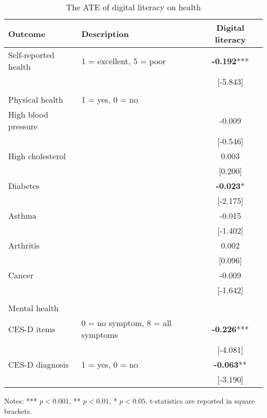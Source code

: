 \documentclass[11pt]{article}
\begin{document}
    \begin{table}[h!]
        \centering
        \caption{The ATE of digital literacy on health}
        \label{tab:ate}
        \begin{threeparttable}
            \begin{tabular}{llc}
                \toprule
                Outcome & Description & Digital literacy \\
                \midrule
                Self-reported health & 1 = excellent, 5 = poor & \textbf{-0.192}*** \\
                & & [-5.843] \\
                & & \\
                Physical health & 1 = yes, 0 = no & \\
                High blood pressure &  & -0.009 \\
                &  & [-0.546] \\
                High cholesterol &  & 0.003 \\
                &  & [0.200] \\
                Diabetes &  & \textbf{-0.023}* \\
                &  & [-2.175] \\
                Asthma &  & -0.015 \\
                &  & [-1.402] \\
                Arthritis &  & 0.002 \\
                &  & [0.096] \\
                Cancer &  & -0.009 \\
                &  & [-1.642] \\
                & & \\
                Mental health & & \\
                CES-D items & 0 = no symptom, 8 = all symptoms & \textbf{-0.226}*** \\
                & & [-4.081] \\
                CES-D diagnosis & 1 = yes, 0 = no & \textbf{-0.063}** \\
                & & [-3.190] \\
                \bottomrule
            \end{tabular}
            \begin{tablenotes}
                \footnotesize
                \item Notes: *** $p < 0.001$, ** $p < 0.01$, * $p < 0.05$. t-statistics are reported in square brackets.
            \end{tablenotes}
        \end{threeparttable}
    \end{table}
\end{document}
